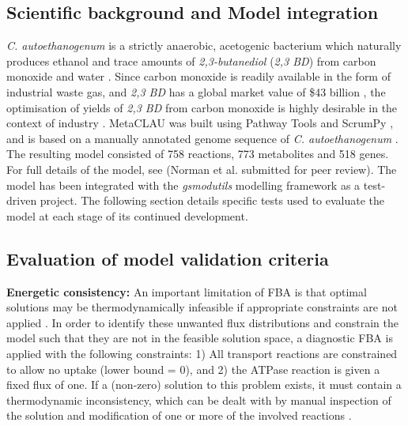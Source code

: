 \documentclass[journal=asbcd6]{achemso}
\begin{document}
\subsection{Scientific background and Model integration}

\textit{C. autoethanogenum} is a strictly anaerobic, acetogenic bacterium which naturally produces ethanol and trace amounts of \textit{2,3-butanediol} (\textit{2,3 BD}) from carbon monoxide and water \cite{abrini1994clostridium,schuchmann2014autotrophy,norman2018progress}. Since carbon monoxide is readily available in the form of industrial waste gas, and \textit{2,3 BD} has a global market value of \$43 billion \cite{kopke201123butanediol}, the optimisation of yields of \textit{2,3 BD} from carbon monoxide is highly desirable in the context of industry \cite{norman2018progress}.   
MetaCLAU was built using Pathway Tools \cite{karp2002pathway} and ScrumPy \cite{poolman2006scrumpy}, and is based on a manually annotated genome sequence of \textit{C. autoethanogenum} \cite{humphreys2015whole}. The resulting model consisted of 758 reactions, 773 metabolites and 518 genes. For full details of the model, see (Norman et al. submitted for peer review).
The model has been integrated with the \textit{gsmodutils} modelling framework as a test-driven project. 
The following section details specific tests used to evaluate the model at each stage of its continued development.

\subsection{Evaluation of model validation criteria}
\textbf{Energetic consistency:} 
An important limitation of FBA is that optimal solutions may be thermodynamically infeasible if appropriate constraints are not applied \cite{Fell1197rohtua}.
In order to identify these unwanted flux distributions and constrain the model such that they are not in the feasible solution space, a diagnostic FBA is applied with the following constraints:
1) All transport reactions are constrained to allow no uptake (lower bound = 0), and 2) the ATPase reaction is given a fixed flux of one.
If a (non-zero) solution to this problem exists, it must contain a thermodynamic inconsistency, which can be dealt with by manual inspection of the solution and modification of one or more of the involved reactions \cite{Fell1197rohtua}.
 
\end{document}
